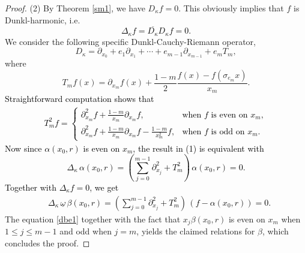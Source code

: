 \documentclass[10pt,a4paper]{amsart}
\begin{document}
\begin{proof}
(2) By Theorem \ref{sm1},  we have $D_{\kappa}f=0$.  This obviously implies that  $f$ is Dunkl-harmonic, i.e.
\textcolor{black}{\begin{equation*}
    \Delta_{\kappa}f=\overline{D_{\kappa}} D_{\kappa}f=0.
\end{equation*}}
We consider the following specific Dunkl-Cauchy-Riemann operator,
\begin{equation*}
    D_{\kappa}= \partial_{x_{0}}+e_{1}\partial_{x_{1}} +\cdots+e_{m-1}\partial_{x_{m-1}}+e_{m}T_{m},
\end{equation*}
where  \begin{equation*}\displaystyle T_{m}f(x)=\partial_{x_{m}}f(x)+\frac{1-m}{2}\frac{f(x)-f(\sigma_{e_{m}}x)}{x_{m}}.\end{equation*}
\textcolor{black}{ Straightforward  computation shows that \begin{equation*}
    		\begin{split}
    			T_{m}^{2}f=\left\{
    			\begin{array}{ll}
    				 \displaystyle  \partial_{x_{m}}^{2}f+\frac{1-m}{x_{m}}\partial_{x_{m}}f, & \mbox{when $f$ is even on $x_{m}$} ,\\
    				\displaystyle \partial_{x_{m}}^{2}f+\frac{1-m}{x_{m}}\partial_{x_{m}}f-\frac{1-m}{x_{m}^{2}}f, & \mbox {when $f$ is odd on $x_{m}$}.
    			\end{array}
    			\right.
    		\end{split}
\end{equation*}
Now since $\alpha(x_{0}, r)$ is even on $x_{m}$, the result in (1) is equivalent with \[\Delta_{\kappa}\,\alpha(x_{0}, r)=
       \left(\sum_{j=0}^{m-1}\partial_{x_{j}}^{2}+T_{m}^{2}\right) \,\alpha(x_{0}, r)=0.\]
Together with $\Delta_{\kappa}f=0$, we get
\begin{equation} \label{dbe1}\begin{split}
       &\Delta_{\kappa}\,\underline{\omega}\,\beta(x_{0}, r)=
       \left(\sum_{j=0}^{m-1}\partial_{x_{j}}^{2}+T_{m}^{2}\right) \,(f-\alpha(x_{0},r))=0.
\end{split}
\end{equation}}
The equation \eqref{dbe1} together with the fact  that $x_{j}\beta(x_{0}, r)$ is even on $x_{m}$ when $1\le j\le m-1$ and odd when $j=m$, yields
 the claimed relations for $\beta$, which concludes the proof.
\end{proof}
\end{document}
